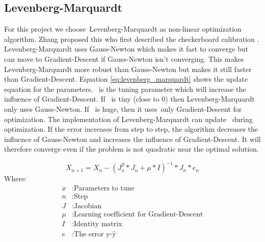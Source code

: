 \documentclass[11pt,a4paper,titlepage,oneside]{report}
\begin{document}
\subsection{Levenberg-Marquardt}
For this project we choose Levenberg-Marquardt as non-linear optimization algorithm. Zhang proposed this who first described the checkerboard calibration \cite{Zhang}. Levenberg-Marquardt uses Gauss-Newton which makes it fast to converge but can move to Gradient-Descent if Gauss-Newton isn't converging. This makes Levenberg-Marquardt more robust than Gauss-Newton but makes it still faster than Gradient-Descent. Equation \ref{eq:levenberg_marquardt} shows the update equation for the parameters. \mu\ is the tuning parameter which will increase the influence of Gradient-Descent. If \mu\ is tiny (close to 0) then Levenberg-Marquardt only uses Gauss-Newton. If \mu\ is huge, then it uses only Gradient-Descent for optimization. The implementation of Levenberg-Marquardt can update \mu\ during optimization. If the error increases from step to step, the algorithm decreases the influence of Gauss-Newton and increases the influence of Gradient-Descent. It will therefore converge even if the problem is not quadratic near the optimal solution.

\begin{equation}\label{eq:levenberg_marquardt}
  X_{n+1} = X_n - (J_n^T*J_n + \mu*I)^{-1}*J_n*e_n
\end{equation}
Where:
\begin{align*}
  x		  &: \text{Parameters to tune}\\
  n		  &: \text{Step}\\
  J		  &: \text{Jacobian}\\
  \mu	  &: \text{Learning coefficient for Gradient-Descent}\\
  I     &: \text{Identity matrix}\\
  e  	  &: \text{The error y-ŷ}
\end{align*}
\end{document}
